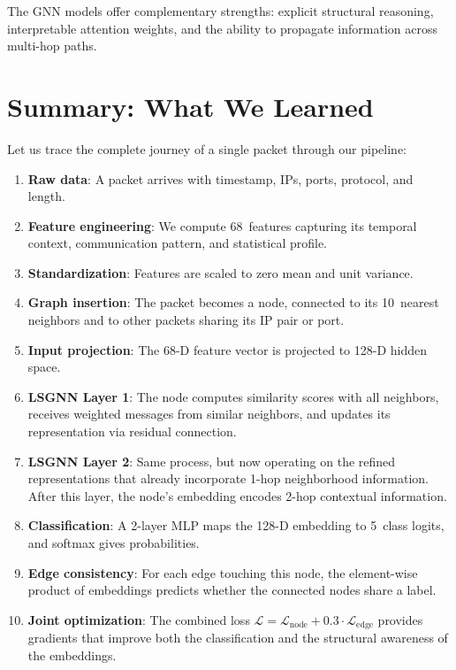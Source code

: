 \documentclass[conference]{IEEEtran}
\newcommand{\Loss}{\mathcal{L}}
\begin{document}
The GNN models offer complementary strengths: explicit structural reasoning, interpretable attention weights, and the ability to propagate information across multi-hop paths.

\section{Summary: What We Learned}
\label{sec:conclusion}

Let us trace the complete journey of a single packet through our pipeline:

\begin{enumerate}
    \item \textbf{Raw data}: A packet arrives with timestamp, IPs, ports, protocol, and length.
    \item \textbf{Feature engineering}: We compute 68~features capturing its temporal context, communication pattern, and statistical profile.
    \item \textbf{Standardization}: Features are scaled to zero mean and unit variance.
    \item \textbf{Graph insertion}: The packet becomes a node, connected to its 10~nearest neighbors and to other packets sharing its IP pair or port.
    \item \textbf{Input projection}: The 68-D feature vector is projected to 128-D hidden space.
    \item \textbf{LSGNN Layer 1}: The node computes similarity scores with all neighbors, receives weighted messages from similar neighbors, and updates its representation via residual connection.
    \item \textbf{LSGNN Layer 2}: Same process, but now operating on the refined representations that already incorporate 1-hop neighborhood information. After this layer, the node's embedding encodes 2-hop contextual information.
    \item \textbf{Classification}: A 2-layer MLP maps the 128-D embedding to 5~class logits, and softmax gives probabilities.
    \item \textbf{Edge consistency}: For each edge touching this node, the element-wise product of embeddings predicts whether the connected nodes share a label.
    \item \textbf{Joint optimization}: The combined loss $\Loss = \Loss_{\text{node}} + 0.3 \cdot \Loss_{\text{edge}}$ provides gradients that improve both the classification and the structural awareness of the embeddings.
\end{enumerate}
\end{document}
